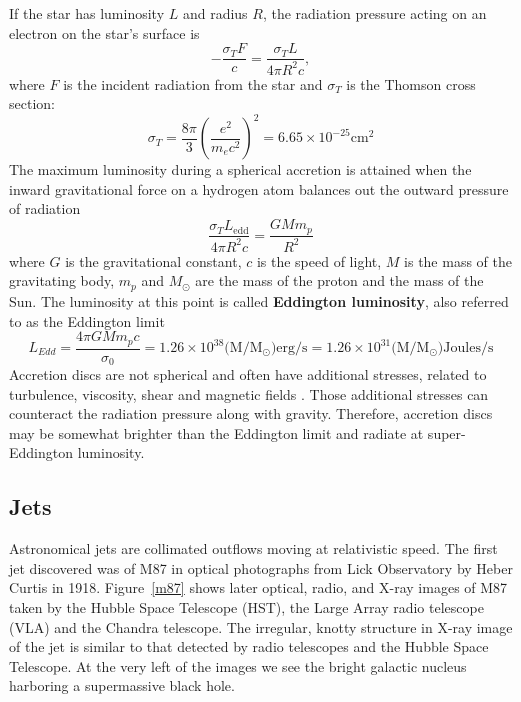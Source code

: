 If the star has luminosity $L$ and radius $R$, the radiation pressure acting on an electron on the star's surface is
\begin{equation}
    -\dfrac{\sigma_T F}{c} = \dfrac{\sigma_T L}{4\pi R^2c},
\end{equation}
where $F$ is the incident radiation from the star and $\sigma_T$ is the Thomson cross section:
\begin{equation}
    \sigma_T = \dfrac{8\pi}{3}(\dfrac{e^2}{m_e c^2})^2 = 6.65 \times 10^{-25} \mathrm{cm^2}
\end{equation}
The maximum luminosity during a spherical accretion is attained when the inward gravitational force on a hydrogen atom balances out the outward pressure of radiation
\begin{equation}
    \dfrac{\sigma_T L_{\mathrm{edd}}}{4\pi R^2c} = \dfrac{GMm_p}{R^2}
\end{equation}
where $G$ is the gravitational constant, $c$ is the speed of light, $M$ is the mass of the gravitating body, $m_p$ and $M_{\odot}$ are the mass of the proton and the mass of the Sun. The luminosity at this point is called \textbf{Eddington luminosity},  also referred to as the Eddington limit 
\begin{equation}
    L_{Edd} = \dfrac{4\pi GMm_pc}{\sigma_0} = 1.26\times 10^{38} (\mathrm{M/M_{\odot}) erg/s} = 1.26\times 10^{31} (\mathrm{M/M_{\odot}) Joules/s}
    \label{eddington}
\end{equation}
Accretion discs are not spherical and often have additional stresses, related to turbulence, viscosity, shear and magnetic fields \citep{Pringle1981, Balbus1998}. Those additional stresses can counteract the radiation pressure along with gravity. Therefore, accretion discs may be somewhat brighter than the Eddington limit and radiate at super-Eddington luminosity. \par

\subsection{Jets}
Astronomical jets are collimated outflows moving at relativistic speed. The first jet discovered was of M87 in optical photographs from Lick Observatory by Heber Curtis in 1918. Figure~\ref{m87} shows later optical, radio, and X-ray images of M87 taken by the Hubble Space Telescope (HST), the Large Array radio telescope (VLA) and the Chandra telescope. The irregular, knotty structure in X-ray image of the jet is similar to that detected by radio telescopes and the Hubble Space Telescope. At the very left of the images we see the bright galactic nucleus harboring a supermassive black hole.\par 

